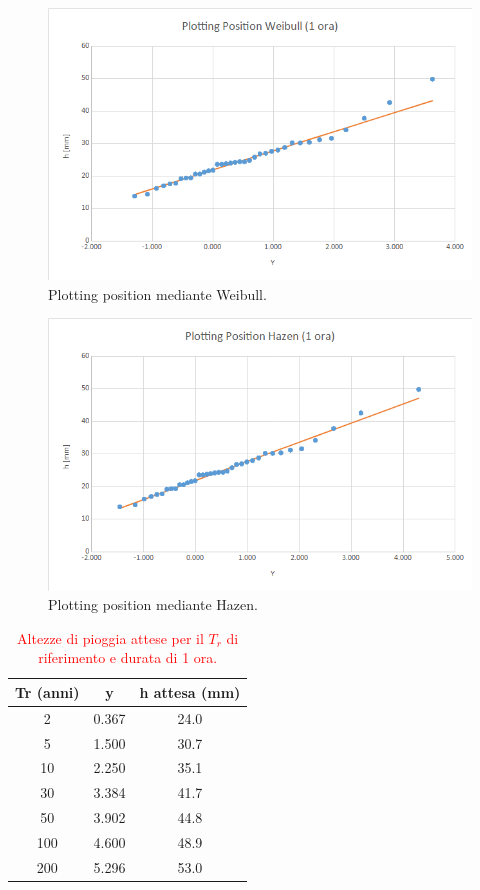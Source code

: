 \begin{figure}[H]\centering
        \includegraphics[scale=.5]{immagini/plot_pos_weib_1ora.png}
        \caption{Plotting position mediante Weibull.}
      \label{plot_pos_weib_1ora}
 \end{figure}

\begin{figure}[H]\centering
        \includegraphics[scale=.5]{immagini/plot_pos_hazen_1ora.png}
        \caption{Plotting position mediante Hazen.}
      \label{plot_pos_hazen_1ora}
\end{figure}

\begin{table}[H] \centering
    \caption{\textcolor{red}{Altezze di pioggia attese per il $T_r$ di riferimento e durata di 1 ora.}}
        \begin{tabular}{ccc}
        \toprule
        Tr (anni) & y     & h attesa (mm) \\
        \midrule
        2 & 0.367 & 24.0  \\
        5 & 1.500 & 30.7  \\
        10  & 2.250 & 35.1          \\
        30  & 3.384 & 41.7          \\
        50  & 3.902 & 44.8          \\
        100 & 4.600 & 48.9          \\
        200 & 5.296 & 53.0          \\         
        \bottomrule
        \end{tabular}
\end{table}

